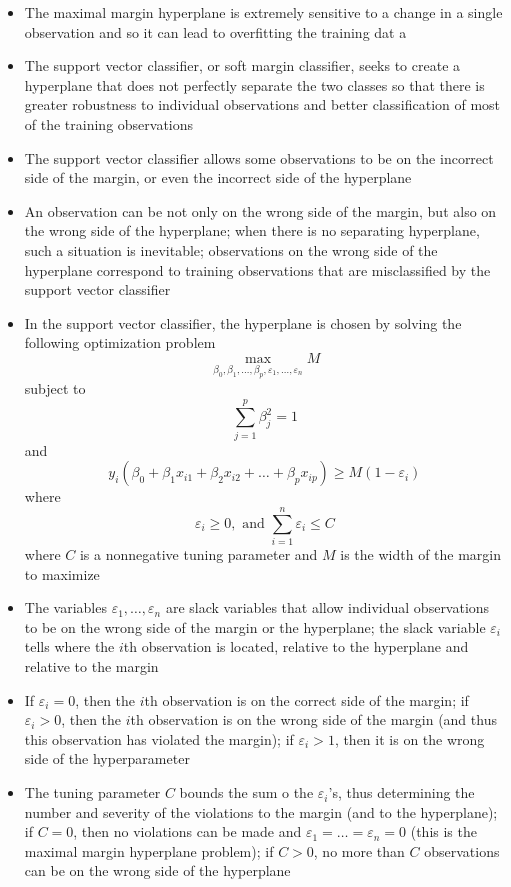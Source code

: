 \documentclass[12pt]{article}
\begin{document}
\begin{itemize} 
\item The maximal margin hyperplane is extremely sensitive to a change in a single observation and so it can lead to overfitting the training dat a
\item The support vector classifier, or soft margin classifier, seeks to create a hyperplane that does not perfectly separate the two classes so that there is greater robustness to individual observations and better classification of most of the training observations 
\item The support vector classifier allows some observations to be on the incorrect side of the margin, or even the incorrect side of the hyperplane 
\item An observation can be not only on the wrong side of the margin, but also on the wrong side of the hyperplane; when there is no separating hyperplane, such a situation is inevitable; observations on the wrong side of the hyperplane correspond to training observations that are misclassified by the support vector classifier 
\item In the support vector classifier, the hyperplane is chosen by solving the following optimization problem $$ \max_{\beta_0,\beta_1,\dots,\beta_p, \varepsilon_1,\dots,\varepsilon_n} M $$ subject to $$ \sum_{j=1}^p \beta_j^2 = 1 $$ and $$ y_i(\beta_0 + \beta_1x_{i1} + \beta_2x_{i2} + \dots + \beta_px_{ip}) \geq M(1 - \varepsilon_i) $$ where $$ \varepsilon_i \geq 0, \text{ and } \sum_{i=1}^n \varepsilon_i \leq C $$ where $C$ is a nonnegative tuning parameter and $M$ is the width of the margin to maximize
\item The variables $\varepsilon_1,\dots,\varepsilon_n$ are slack variables that allow individual observations to be on the wrong side of the margin or the hyperplane; the slack variable $\varepsilon_i$ tells where the $i$th observation is located, relative to the hyperplane and relative to the margin
\item If $\varepsilon_i = 0$, then the $i$th observation is on the correct side of the margin; if $\varepsilon_i > 0$, then the $i$th observation is on the wrong side of the margin (and thus this observation has violated the margin); if $\varepsilon_i > 1$, then it is on the wrong side of the hyperparameter 
\item The tuning parameter $C$ bounds the sum o the $\varepsilon_i$'s, thus determining the number and severity of the violations to the margin (and to the hyperplane); if $C = 0$, then no violations can be made and $\varepsilon_1 = \dots = \varepsilon_n = 0$ (this is the maximal margin hyperplane problem); if $C > 0$, no more than $C$ observations can be on the wrong side of the hyperplane

\end{itemize}
\end{document}
